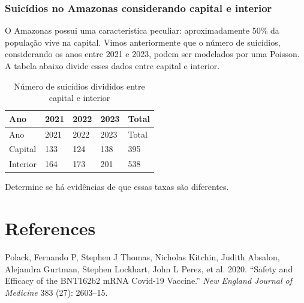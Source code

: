 \documentclass[
  letterpaper,
  DIV=11,
  numbers=noendperiod]{scrreprt}
\newlength{\cslhangindent}
\newenvironment{CSLReferences}[2] %
 {\begin{list}{}{%
  \setlength{\itemindent}{0pt}
  \setlength{\leftmargin}{0pt}
  \setlength{\parsep}{0pt}
  \ifodd #1
   \setlength{\leftmargin}{\cslhangindent}
   \setlength{\itemindent}{-1\cslhangindent}
  \fi
  \setlength{\itemsep}{#2\baselineskip}}}
 {\end{list}}
\theoremstyle{plain}
\theoremstyle{definition}
\theoremstyle{definition}
\theoremstyle{remark}
\begin{document}
\subsection{Suicídios no Amazonas considerando capital e
interior}\label{suicuxeddios-no-amazonas-considerando-capital-e-interior-1}

O Amazonas possui uma característica peculiar: aproximadamente 50\% da
população vive na capital. Vimos anteriormente que o número de
suicídios, considerando os anos entre 2021 e 2023, podem ser modelados
por uma Poisson. A tabela abaixo divide esses dados entre capital e
interior.

\begin{longtable}[]{@{}lllll@{}}
\caption{Número de suicídios divididos entre capital e
interior}\tabularnewline
\toprule\noalign{}
Ano & 2021 & 2022 & 2023 & Total \\
\midrule\noalign{}
\endfirsthead
\toprule\noalign{}
Ano & 2021 & 2022 & 2023 & Total \\
\midrule\noalign{}
\endhead
\bottomrule\noalign{}
\endlastfoot
Capital & 133 & 124 & 138 & 395 \\
Interior & 164 & 173 & 201 & 538 \\
\end{longtable}

Determine se há evidências de que essas taxas são diferentes.


\chapter*{References}\label{references}


\label{refs}
\begin{CSLReferences}{1}{0}
Polack, Fernando P, Stephen J Thomas, Nicholas Kitchin, Judith Absalon,
Alejandra Gurtman, Stephen Lockhart, John L Perez, et al. 2020.
{``Safety and Efficacy of the BNT162b2 mRNA Covid-19 Vaccine.''}
\emph{New England Journal of Medicine} 383 (27): 2603--15.

\end{CSLReferences}
\end{document}
